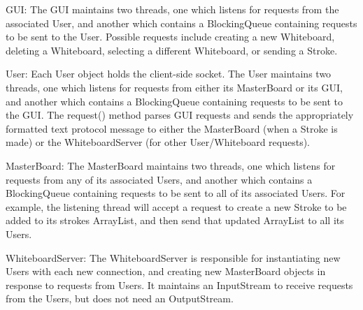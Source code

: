 GUI: The GUI maintains two threads, one which listens for requests from the associated User, and another which contains a BlockingQueue containing requests to be sent to the User. Possible requests include creating a new Whiteboard, deleting a Whiteboard, selecting a different Whiteboard, or sending a Stroke.

User: Each User object holds the client-side socket. The User maintains two threads, one which listens for requests from either its MasterBoard or its GUI, and another which contains a BlockingQueue containing requests to be sent to the GUI. The request() method parses GUI requests and sends the appropriately formatted text protocol message to either the MasterBoard (when a Stroke is made) or the WhiteboardServer (for other User/Whiteboard requests).

MasterBoard: The MasterBoard maintains two threads, one which listens for requests from any of its associated Users, and another which contains a BlockingQueue containing requests to be sent to all of its associated Users. For example, the listening thread will accept a request to create a new Stroke to be added to its strokes ArrayList, and then send that updated ArrayList to all its Users.

WhiteboardServer: The WhiteboardServer is responsible for instantiating new Users with each new connection, and creating new MasterBoard objects in response to requests from Users. It maintains an InputStream to receive requests from the Users, but does not need an OutputStream.